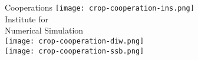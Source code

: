   \begin{frame}{Cooperations}
  	\centering   \vspace{0.25cm}
  	\texttt{[image: crop-cooperation-ins.png]} \\\vspace{-0.5cm}
  	\footnotesize{Institute for \\ Numerical Simulation}\vspace{0.3cm}   \\ \vspace{0.8cm}
  	\texttt{[image: crop-cooperation-diw.png]} \\ \vspace{0.35cm}
  	\texttt{[image: crop-cooperation-ssb.png]}
%
%
%
\end{frame}
